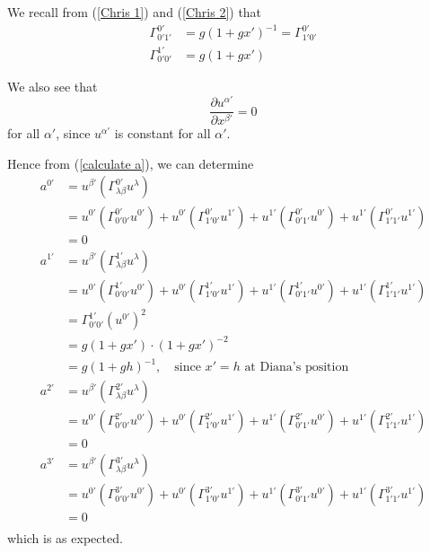 \documentclass[a4paper]{article} %
\begin{document}
We recall from (\ref{Chris 1}) and (\ref{Chris 2}) that
\begin{align*}
\Gamma^{0'}_{0'1'}&=g(1+gx')^{-1}=\Gamma^{0'}_{1'0'}\\
\Gamma^{1'}_{0'0'}&=g(1+gx')
\end{align*}

We also see that
\begin{equation}
\frac{\partial u^{\alpha'}}{\partial x^{\beta'}}=0
\end{equation}
for all $\alpha'$, since $u^{\alpha'}$ is constant for all $\alpha'$.

Hence from (\ref{calculate a}), we can determine
\begin{align}
a^{0'}&=u^{\beta'}\left(\Gamma^{0'}_{\lambda\beta} u^{\lambda}\right)\\
&=u^{0'}\left(\Gamma^{0'}_{0'0'}u^{0'}\right)+u^{0'}\left(\Gamma^{0'}_{1'0'}u^{1'}\right)+
u^{1'}\left(\Gamma^{0'}_{0'1'}u^{0'}\right)+u^{1'}\left(\Gamma^{0'}_{1'1'}u^{1'}\right)\\
&=0\\
a^{1'}&=u^{\beta'}\left(\Gamma^{1'}_{\lambda\beta} u^{\lambda}\right)\\
&=u^{0'}\left(\Gamma^{1'}_{0'0'}u^{0'}\right)+u^{0'}\left(\Gamma^{1'}_{1'0'}u^{1'}\right)+
u^{1'}\left(\Gamma^{1'}_{0'1'}u^{0'}\right)+u^{1'}\left(\Gamma^{1'}_{1'1'}u^{1'}\right)\\
&=\Gamma^{1'}_{0'0'}\left(u^{0'}\right)^2\\
&=g(1+gx')\cdot (1+gx')^{-2}\\
&=g(1+gh)^{-1},\quad\text{since $x'=h$ at Diana's position}\\
a^{2'}&=u^{\beta'}\left(\Gamma^{2'}_{\lambda\beta} u^{\lambda}\right)\\
&=u^{0'}\left(\Gamma^{2'}_{0'0'}u^{0'}\right)+u^{0'}\left(\Gamma^{2'}_{1'0'}u^{1'}\right)+
u^{1'}\left(\Gamma^{2'}_{0'1'}u^{0'}\right)+u^{1'}\left(\Gamma^{2'}_{1'1'}u^{1'}\right)\\
&=0\\
a^{3'}&=u^{\beta'}\left(\Gamma^{3'}_{\lambda\beta} u^{\lambda}\right)\\
&=u^{0'}\left(\Gamma^{3'}_{0'0'}u^{0'}\right)+u^{0'}\left(\Gamma^{3'}_{1'0'}u^{1'}\right)+
u^{1'}\left(\Gamma^{3'}_{0'1'}u^{0'}\right)+u^{1'}\left(\Gamma^{3'}_{1'1'}u^{1'}\right)\\
&=0\\
\end{align}
which is as expected.

\end{document}
